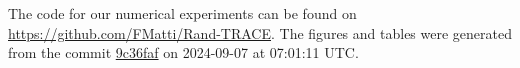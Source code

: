 The code for our numerical experiments can be found on \url{https://github.com/FMatti/Rand-TRACE}. The figures and tables were generated from the commit \href{https://github.com/FMatti/Rand-TRACE/tree/9c36faf}{9c36faf} on 2024-09-07 at 07:01:11 UTC.
